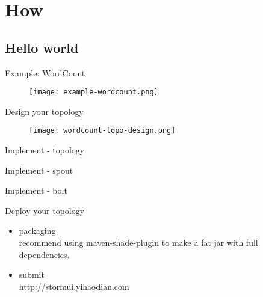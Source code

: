 \documentclass{beamer}
\begin{document}
\section{How}
\subsection{Hello world}
\begin{frame}{Example: WordCount}
  \begin{figure}
    \centering
    \texttt{[image: example-wordcount.png]}
  \end{figure}
\end{frame}
\begin{frame}{Design your topology}
  \begin{figure}
    \centering
    \texttt{[image: wordcount-topo-design.png]}
  \end{figure}
\end{frame}
\begin{frame}{Implement - topology}

\end{frame}
\begin{frame}{Implement - spout}

\end{frame}
\begin{frame}{Implement - bolt}

\end{frame}
\begin{frame}{Deploy your topology}
  \begin{itemize}
    \item packaging\\
      recommend using maven-shade-plugin to make a fat jar with full dependencies.
    \item submit\\
      http://stormui.yihaodian.com
  \end{itemize}
\end{frame}
\end{document}
